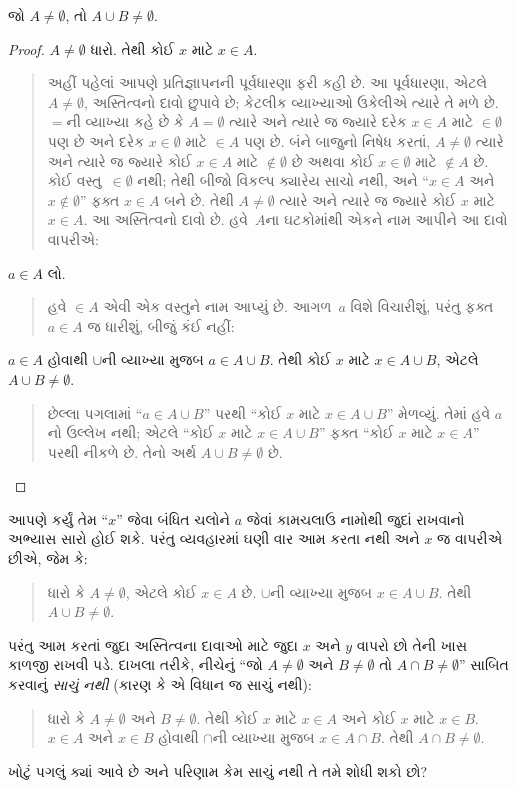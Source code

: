 \begin{prop}
જો $A \neq \emptyset$, તો $A \cup B \neq \emptyset$.
\end{prop}

\begin{proof}
  $A \neq \emptyset$ ધારો. તેથી કોઈ $x$ માટે $x \in A$.
  \begin{quote}
    અહીં પહેલાં આપણે પ્રતિજ્ઞાપનની પૂર્વધારણા ફરી કહી છે. આ
    પૂર્વધારણા, એટલે $A \neq \emptyset$, અસ્તિત્વનો દાવો
    છુપાવે છે; કેટલીક વ્યાખ્યાઓ ઉકેલીએ ત્યારે તે મળે છે. $=$ની
    વ્યાખ્યા કહે છે કે $A = \emptyset$ ત્યારે અને ત્યારે જ જ્યારે
    દરેક $x \in A$ માટે $\in \emptyset$ પણ છે અને દરેક $x \in
    \emptyset$ માટે $\in A$ પણ છે. બંને બાજુનો નિષેધ કરતાં,
    $A \neq
    \emptyset$ ત્યારે અને ત્યારે જ જ્યારે કોઈ $x \in A$ માટે
    $\notin \emptyset$ છે અથવા કોઈ $x \in \emptyset$ માટે
    $\notin A$ છે. કોઈ વસ્તુ~$\in \emptyset$ નથી; તેથી બીજો
    વિકલ્પ ક્યારેય સાચો નથી, અને ``$x \in A$ અને $x
    \notin \emptyset$'' ફક્ત $x \in A$ બને છે. તેથી $A \neq
    \emptyset$ ત્યારે અને ત્યારે જ જ્યારે કોઈ $x$ માટે
    $x \in A$. આ અસ્તિત્વનો
    દાવો છે. હવે~$A$ના ઘટકોમાંથી એકને નામ આપીને આ
    દાવો વાપરીએ:
  \end{quote}
  $a \in A$ લો.
  \begin{quote}
    હવે $\in A$ એવી એક વસ્તુને નામ આપ્યું છે. આગળ~$a$
    વિશે વિચારીશું, પરંતુ ફક્ત $a \in A$ જ ધારીશું, બીજું
    કંઈ નહીં:
  \end{quote}
  $a \in A$ હોવાથી $\cup$ની વ્યાખ્યા મુજબ $a \in A \cup B$.
  તેથી કોઈ $x$ માટે $x \in A \cup B$, એટલે $A \cup B \neq \emptyset$.
  \begin{quote}
    છેલ્લા પગલામાં ``$a \in A \cup B$'' પરથી ``કોઈ
    $x$ માટે $x \in A \cup B$'' મેળવ્યું. તેમાં હવે $a$નો
    ઉલ્લેખ નથી; એટલે ``કોઈ $x$ માટે $x \in A \cup B$''
    ફક્ત ``કોઈ $x$ માટે $x \in A$'' પરથી નીકળે છે. તેનો
    અર્થ $A \cup B \neq
    \emptyset$ છે.
  \end{quote}
\end{proof}

આપણે કર્યું તેમ ``$x$'' જેવા બંધિત ચલોને $a$ જેવાં કામચલાઉ
નામોથી જુદાં રાખવાનો અભ્યાસ સારો હોઈ શકે. પરંતુ વ્યવહારમાં
ઘણી વાર આમ કરતા નથી અને $x$ જ વાપરીએ છીએ, જેમ કે:
\begin{quote}
ધારો કે $A \neq \emptyset$, એટલે કોઈ $x \in A$ છે. $\cup$ની
વ્યાખ્યા મુજબ $x \in A \cup B$. તેથી $A \cup B \neq \emptyset$.
\end{quote}
પરંતુ આમ કરતાં જુદા અસ્તિત્વના દાવાઓ માટે જુદા $x$ અને $y$
વાપરો છો તેની ખાસ કાળજી રાખવી પડે. દાખલા તરીકે, નીચેનું
``જો $A \neq
\emptyset$ અને $B \neq \emptyset$ તો $A \cap B \neq \emptyset$''
સાબિત કરવાનું \emph{સાચું નથી} (કારણ કે એ વિધાન જ સાચું નથી):
\begin{quote}
ધારો કે $A \neq \emptyset$ અને $B \neq \emptyset$. તેથી કોઈ $x$ માટે $x
\in A$ અને કોઈ $x$ માટે $x \in B$. $x \in A$ અને $x \in
B$ હોવાથી $\cap$ની વ્યાખ્યા મુજબ $x \in A \cap B$. તેથી $A \cap B \neq
\emptyset$.
\end{quote}
ખોટું પગલું ક્યાં આવે છે અને પરિણામ કેમ સાચું નથી તે તમે
શોધી શકો છો?
\endgroup


